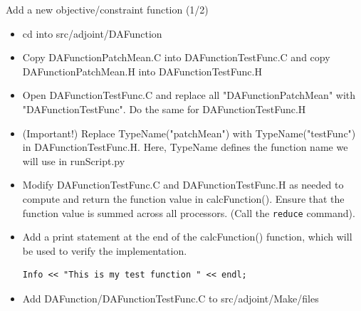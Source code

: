 \documentclass{bredelebeamer}
\begin{document}
\begin{frame}[fragile]{Add a new objective/constraint function (1/2)}

\begin{itemize}
  \item cd into src/adjoint/DAFunction
  \item Copy DAFunctionPatchMean.C into DAFunctionTestFunc.C and copy DAFunctionPatchMean.H into DAFunctionTestFunc.H
  \item Open DAFunctionTestFunc.C and replace all "DAFunctionPatchMean" with "DAFunctionTestFunc". Do the same for DAFunctionTestFunc.H
  \item (Important!) Replace TypeName("patchMean") with TypeName("testFunc") in DAFunctionTestFunc.H. Here, TypeName defines the function name we will use in runScript.py
  \item Modify DAFunctionTestFunc.C and DAFunctionTestFunc.H as needed to compute and return the function value in calcFunction(). Ensure that the function value is summed across all processors. (Call the \texttt{reduce} command).
  \item Add a print statement at the end of the calcFunction() function, which will be used to verify the implementation.
    \begin{lstlisting}
Info << "This is my test function " << endl;
 \end{lstlisting}
 \item Add DAFunction/DAFunctionTestFunc.C to src/adjoint/Make/files

\end{itemize}

\end{frame}
\end{document}
